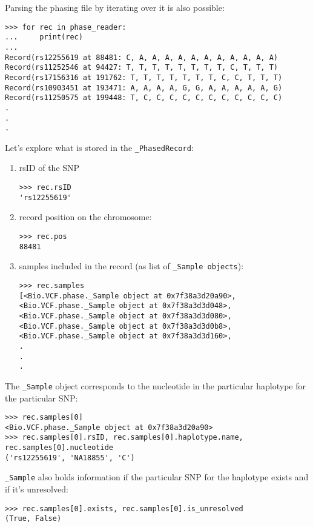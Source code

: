 \noindent Parsing the phasing file by iterating over it is also possible:

\begin{verbatim}
>>> for rec in phase_reader:
...     print(rec)
...
Record(rs12255619 at 88481: C, A, A, A, A, A, A, A, A, A, A, A)
Record(rs11252546 at 94427: T, T, T, T, T, T, T, T, C, T, T, T)
Record(rs17156316 at 191762: T, T, T, T, T, T, T, C, C, T, T, T)
Record(rs10903451 at 193471: A, A, A, A, G, G, A, A, A, A, A, G)
Record(rs11250575 at 199448: T, C, C, C, C, C, C, C, C, C, C, C)
.
.
.

\end{verbatim}

\noindent Let's explore what is stored in the \verb|_PhasedRecord|:
\begin{enumerate}
\item rsID of the SNP
\begin{verbatim}
>>> rec.rsID
'rs12255619'
\end{verbatim}

\item record position on the chromosome:
\begin{verbatim}
>>> rec.pos
88481
\end{verbatim}

\item samples included in the record (as list of \verb|_Sample objects|):
\begin{verbatim}
>>> rec.samples
[<Bio.VCF.phase._Sample object at 0x7f38a3d20a90>,
<Bio.VCF.phase._Sample object at 0x7f38a3d3d048>,
<Bio.VCF.phase._Sample object at 0x7f38a3d3d080>,
<Bio.VCF.phase._Sample object at 0x7f38a3d3d0b8>,
<Bio.VCF.phase._Sample object at 0x7f38a3d3d160>,
.
.
.
\end{verbatim}
\end{enumerate}

\noindent The \verb|_Sample| object corresponds to the nucleotide in the particular haplotype for the particular SNP:

\begin{verbatim}
>>> rec.samples[0]
<Bio.VCF.phase._Sample object at 0x7f38a3d20a90>
>>> rec.samples[0].rsID, rec.samples[0].haplotype.name, rec.samples[0].nucleotide
('rs12255619', 'NA18855', 'C')
\end{verbatim}

\noindent \verb|_Sample| also holds information if the particular SNP for the haplotype exists and if it's unresolved:

\begin{verbatim}
>>> rec.samples[0].exists, rec.samples[0].is_unresolved
(True, False)
\end{verbatim}

